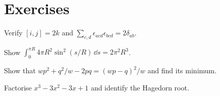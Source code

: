 \section*{Exercises}
\begin{exercise}
Verify $[i,j]=2k$ and $\sum_{c,d}\epsilon_{acd}\epsilon_{bcd}=2\delta_{ab}$.
\end{exercise}
\begin{exercise}
Show $\int_0^{\pi R}4\pi R^2\sin^2(s/R)\,\dd s=2\pi^2R^3$.
\end{exercise}
\begin{exercise}
Show that $wp^2+q^2/w-2pq=(wp-q)^2/w$ and find its minimum.
\end{exercise}
\begin{exercise}
Factorise $x^3-3x^2-3x+1$ and identify the Hagedorn root.
\end{exercise}

